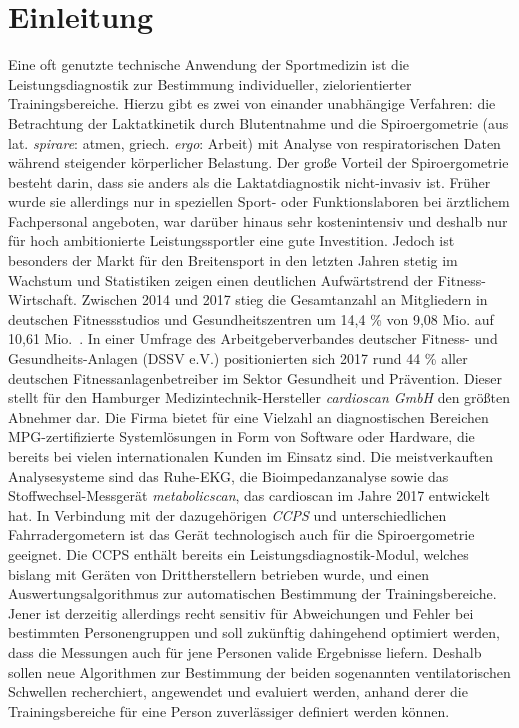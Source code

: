 \chapter{Einleitung}
%
Eine oft genutzte technische Anwendung der Sportmedizin ist die Leistungsdiagnostik zur Bestimmung individueller, zielorientierter Trainingsbereiche. Hierzu gibt es zwei von einander unabhängige Verfahren: die Betrachtung der Laktatkinetik durch Blutentnahme und die Spiroergometrie (aus lat. \textsl{spirare}: atmen, griech. \textsl{ergo}: Arbeit) mit Analyse von respiratorischen Daten während steigender körperlicher Belastung. Der große Vorteil der Spiroergometrie besteht darin, dass sie anders als die Laktatdiagnostik nicht-invasiv ist. Früher wurde sie allerdings nur in speziellen Sport- oder Funktionslaboren bei ärztlichem Fachpersonal angeboten, war darüber hinaus sehr kostenintensiv und deshalb nur für hoch ambitionierte Leistungssportler eine gute Investition. Jedoch ist besonders der Markt für den Breitensport in den letzten Jahren stetig im Wachstum und Statistiken zeigen einen deutlichen Aufwärtstrend der Fitness-Wirtschaft. Zwischen 2014 und 2017 stieg die Gesamtanzahl an Mitgliedern in deutschen Fitnessstudios und Gesundheitszentren um 14,4 \% von 9,08 Mio. auf 10,61 Mio.~\cite{DSSV.2018}. In einer Umfrage des Arbeitgeberverbandes deutscher Fitness- und Gesundheits-Anlagen (DSSV e.V.) positionierten sich 2017 rund 44 \% aller deutschen Fitnessanlagenbetreiber im Sektor Gesundheit und Prävention. Dieser stellt für den Hamburger Medizintechnik-Hersteller \textsl{cardioscan GmbH} den größten Abnehmer dar. Die Firma bietet für eine Vielzahl an diagnostischen Bereichen MPG-zertifizierte Systemlösungen in Form von Software oder Hardware, die bereits bei vielen internationalen Kunden im Einsatz sind. Die meistverkauften Analysesysteme sind das Ruhe-EKG, die Bioimpedanzanalyse sowie das Stoffwechsel-Messgerät \textsl{metabolicscan}, das cardioscan im Jahre 2017 entwickelt hat. In Verbindung mit der dazugehörigen \textsl{\gls{CCPS}} und unterschiedlichen Fahrradergometern ist das Gerät technologisch auch für die Spiroergometrie geeignet. Die \gls{CCPS} enthält bereits ein Leistungsdiagnostik-Modul, welches bislang mit Geräten von Drittherstellern betrieben wurde, und einen Auswertungsalgorithmus zur automatischen Bestimmung der Trainingsbereiche. Jener ist derzeitig allerdings recht sensitiv für Abweichungen und Fehler bei bestimmten Personengruppen und soll zukünftig dahingehend optimiert werden, dass die Messungen auch für jene Personen valide Ergebnisse liefern. Deshalb sollen neue Algorithmen zur Bestimmung der beiden sogenannten ventilatorischen Schwellen recherchiert, angewendet und evaluiert werden, anhand derer die Trainingsbereiche für eine Person zuverlässiger definiert werden können.
%
